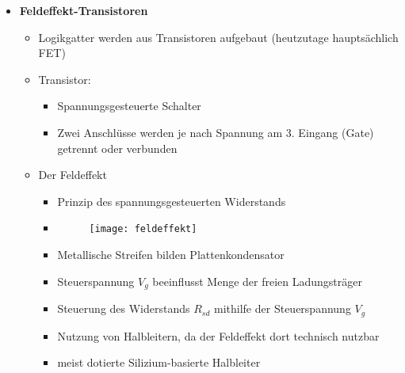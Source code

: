 \begin{itemize}
\item \textbf{Feldeffekt-Transistoren}
	\begin{itemize}
	\item Logikgatter werden aus Transistoren aufgebaut (heutzutage hauptsächlich FET)
	\item Transistor: 
		\begin{itemize}
		\item Spannungsgesteuerte Schalter
		\item Zwei Anschlüsse werden je nach Spannung am 3. Eingang (Gate) getrennt oder verbunden
		\end{itemize}			
	\item Der Feldeffekt
		\begin{itemize}
		\item Prinzip des spannungsgesteuerten Widerstands
		\item[] \begin{figure}[H]
				\begin{center}
				\texttt{[image: feldeffekt]}
				\end{center}
				\end{figure}
		\item Metallische Streifen bilden Plattenkondensator
		\item Steuerspannung $V_g$ beeinflusst Menge der freien Ladungsträger
		\item Steuerung des Widerstands $R_{sd}$ mithilfe der Steuerspannung $V_g$ 
		\item Nutzung von Halbleitern, da der Feldeffekt dort technisch nutzbar
		\item meist dotierte Silizium-basierte Halbleiter
		\end{itemize}
		

\end{itemize}
\end{itemize}
